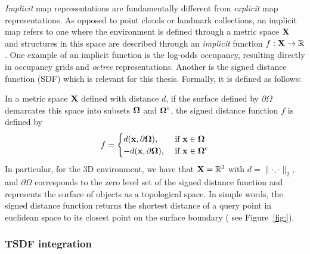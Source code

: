 \emph{Implicit} map representations are fundamentally different from \emph{explicit} map representations. As opposed to point clouds or landmark collections, an implicit map refers to one where the environment is defined through a metric space $\mathbf{X}$ and structures in this space are described through an \emph{implicit} function $f : \mathbf{X} \rightarrow \mathbb{R}$. One example of an implicit function is the log-odds occupancy, resulting directly in occupancy grids \cite{thrunProbabilisticRoboticsIntelligent2005} and \emph{octree} \cite{hornungOctoMapEfficientProbabilistic2013} representations. Another is the signed distance function (SDF) which is relevant for this thesis. Formally, it is defined as follows:

In a metric space $\mathbf{X}$ defined with distance $d$, if the surface defined by $\partial \Omega$ demarcates this space into subsets  $\boldsymbol \Omega$ and  $\boldsymbol \Omega^c$, the signed distance function $f$ is defined by
\begin{align*}
   f = \begin{cases}
       d(\mathbf{x}, \partial \boldsymbol \Omega), &\text{ if } \mathbf{x} \in \boldsymbol \Omega\\
       -d(\mathbf{x}, \partial \boldsymbol \Omega), &\text{ if } \mathbf{x} \in \boldsymbol \Omega^c
   \end{cases}
\end{align*}
In particular, for the 3D environment, we have that $\mathbf{X} = \mathbb{R}^3$ with $d = \|\cdot, \cdot \|_2$, and $\partial \Omega$ corresponds to the zero level set of the signed distance function and represents the surface of objects as a topological space. In simple words, the signed distance function returns the shortest distance of a query point in euclidean space to its closest point on the surface boundary ( see Figure~\ref{fig:}).

\subsubsection{TSDF integration}


